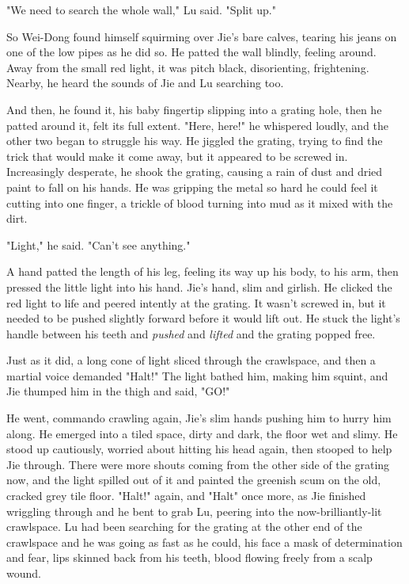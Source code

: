 "We need to search the whole wall," Lu said. "Split up."

So Wei-Dong found himself squirming over Jie's bare calves, tearing
his jeans on one of the low pipes as he did so. He patted the wall
blindly, feeling around. Away from the small red light, it was
pitch black, disorienting, frightening. Nearby, he heard the sounds
of Jie and Lu searching too.

And then, he found it, his baby fingertip slipping into a grating
hole, then he patted around it, felt its full extent. "Here, here!"
he whispered loudly, and the other two began to struggle his way.
He jiggled the grating, trying to find the trick that would make it
come away, but it appeared to be screwed in. Increasingly
desperate, he shook the grating, causing a rain of dust and dried
paint to fall on his hands. He was gripping the metal so hard he
could feel it cutting into one finger, a trickle of blood turning
into mud as it mixed with the dirt.

"Light," he said. "Can't see anything."

A hand patted the length of his leg, feeling its way up his body,
to his arm, then pressed the little light into his hand. Jie's
hand, slim and girlish. He clicked the red light to life and peered
intently at the grating. It wasn't screwed in, but it needed to be
pushed slightly forward before it would lift out. He stuck the
light's handle between his teeth and \emph{pushed} and
\emph{lifted} and the grating popped free.

Just as it did, a long cone of light sliced through the crawlspace,
and then a martial voice demanded "Halt!" The light bathed him,
making him squint, and Jie thumped him in the thigh and said,
"GO!"

He went, commando crawling again, Jie's slim hands pushing him to
hurry him along. He emerged into a tiled space, dirty and dark, the
floor wet and slimy. He stood up cautiously, worried about hitting
his head again, then stooped to help Jie through. There were more
shouts coming from the other side of the grating now, and the light
spilled out of it and painted the greenish scum on the old, cracked
grey tile floor. "Halt!" again, and "Halt" once more, as Jie
finished wriggling through and he bent to grab Lu, peering into the
now-brilliantly-lit crawlspace. Lu had been searching for the
grating at the other end of the crawlspace and he was going as fast
as he could, his face a mask of determination and fear, lips
skinned back from his teeth, blood flowing freely from a scalp
wound.

